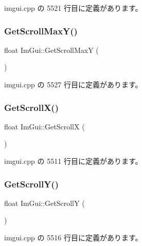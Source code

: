  imgui.\+cpp の 5521 行目に定義があります。

\mbox{\label{namespace_im_gui_ab34c0d5c63908a7ff50923151730f76a}} 
\subsubsection{\texorpdfstring{Get\+Scroll\+Max\+Y()}{GetScrollMaxY()}}
{\footnotesize\ttfamily float Im\+Gui\+::\+Get\+Scroll\+MaxY (\begin{DoxyParamCaption}{ }\end{DoxyParamCaption})}



 imgui.\+cpp の 5527 行目に定義があります。

\mbox{\label{namespace_im_gui_a6f88335d87da3be81dc6e24cb1812923}} 
\subsubsection{\texorpdfstring{Get\+Scroll\+X()}{GetScrollX()}}
{\footnotesize\ttfamily float Im\+Gui\+::\+Get\+ScrollX (\begin{DoxyParamCaption}{ }\end{DoxyParamCaption})}



 imgui.\+cpp の 5511 行目に定義があります。

\mbox{\label{namespace_im_gui_a3c924a2eeb8b2ddfb40ea17be7ea12a6}} 
\subsubsection{\texorpdfstring{Get\+Scroll\+Y()}{GetScrollY()}}
{\footnotesize\ttfamily float Im\+Gui\+::\+Get\+ScrollY (\begin{DoxyParamCaption}{ }\end{DoxyParamCaption})}



 imgui.\+cpp の 5516 行目に定義があります。

\mbox{\label{namespace_im_gui_aa2b8fa1a5320cd70f23a53d8fe604fb2}} 
